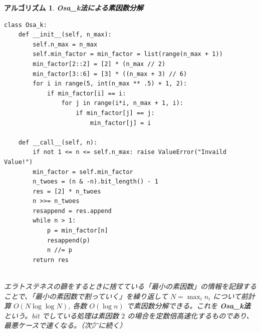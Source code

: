 \documentclass[12pt, a4j]{ltjsarticle}
\newtheorem{alg}[thm]{アルゴリズム}
\begin{document}
\begin{alg} {\bf Osa\_k法による素因数分解}\\\upshape
\begin{lstlisting}
class Osa_k:
    def __init__(self, n_max):
        self.n_max = n_max
        self.min_factor = min_factor = list(range(n_max + 1))
        min_factor[2::2] = [2] * (n_max // 2)
        min_factor[3::6] = [3] * ((n_max + 3) // 6)
        for i in range(5, int(n_max ** .5) + 1, 2):
            if min_factor[i] == i:
                for j in range(i*i, n_max + 1, i):
                    if min_factor[j] == j:
                        min_factor[j] = i

    def __call__(self, n):
        if not 1 <= n <= self.n_max: raise ValueError("Invaild Value!")
        min_factor = self.min_factor
        n_twoes = (n & -n).bit_length() - 1
        res = [2] * n_twoes
        n >>= n_twoes
        resappend = res.append
        while n > 1:
            p = min_factor[n]
            resappend(p)
            n //= p
        return res
\end{lstlisting}
\quad\\
エラトステネスの篩をするときに捨てている「最小の素因数」の情報を記録することで、「最小の素因数で割っていく」を繰り返して $N=\max_i n_i$ について前計算 $O(N \log\log N)$, 各数 $O(\log n)$ で素因数分解できる。これを {\bf Osa\_k法} という。bit でしている処理は素因数 $2$ の場合を定数倍高速化するものであり、最悪ケースで速くなる。（次㌻に続く）
\end{alg}

\newpage
\end{document}
